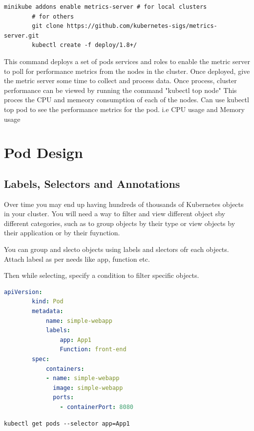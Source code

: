 \documentclass[11pt]{book}
\begin{document}
    \begin{lstlisting}[language=terminal, caption={Commands}]
        minikube addons enable metrics-server # for local clusters
        # for others
        git clone https://github.com/kubernetes-sigs/metrics-server.git
        kubectl create -f deploy/1.8+/
    \end{lstlisting}

    This command deploys a set of pods services and roles to enable the metric server to poll for performance metrics from the nodes in the cluster.
    Once deployed, give the metric server some time to collect and process data.
    Once process, cluster performance can be viewed by running the command "kubectl top node"
    This proces the CPU and memeory consumption of each of the nodes.
    Can use kubectl top pod to see the performance metrics for the pod. i.e CPU usage and Memory usage

    \chapter{Pod Design}


    \section{Labels, Selectors and Annotations}
    Over time you may end up having hundreds of thousands of Kubernetes objects in your cluster.
    You will need a way to filter and view different object sby different categories, such as to group objects by their type or view objects by their application or by their fuynction.

    You can group and slecto objects using labels and slectors ofr each objects.
    Attach labesl as per needs like app, function etc.

    Then while selecting, specify a condition to filter specific objects.

    \begin{lstlisting}[language=yaml, caption={Selector example}]
        apiVersion:
        kind: Pod
        metadata:
            name: simple-webapp
            labels:
                app: App1
                Function: front-end
        spec:
            containers:
            - name: simple-webapp
              image: simple-webapp
              ports:
                - containerPort: 8080
    \end{lstlisting}

    \begin{lstlisting}[language=terminal, caption={Commands}]
        kubectl get pods --selector app=App1
    \end{lstlisting}
\end{document}
